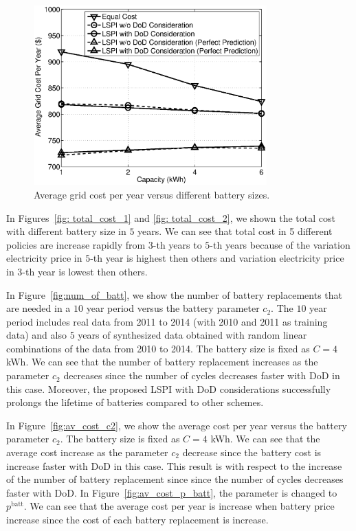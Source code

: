 \begin{figure}[H]
  \centering
  \includegraphics[width = 0.8\textwidth]{fig/av_cost_grid.eps}
  \caption{Average grid cost per year versus different battery sizes.}
  \label{fig: av_cost_grid}
\end{figure}

In Figures~\ref{fig: total_cost_1} and \ref{fig: total_cost_2}, we shown the total cost with different battery size in $5$ years. We can see that total cost in 5 different policies are increase rapidly from $3$-th years to $5$-th years because of the variation electricity price in $5$-th year is highest then others and variation electricity price in $3$-th year is lowest then others.

In Figure~\ref{fig:num_of_batt}, we show the number of battery replacements that are needed in a $10$ year period versus the battery parameter $c_2$. The $10$ year period includes real data from 2011 to 2014 (with 2010 and 2011 as training data) and also $5$ years of synthesized data obtained with random linear combinations of the data from 2010 to 2014. The battery size is fixed as $C=4$ kWh. We can see that the number of battery replacement increases as the parameter $c_2$ decreases since the number of cycles decreases faster with DoD in this case. Moreover, the proposed LSPI with DoD considerations successfully prolongs the lifetime of batteries compared to other schemes.

In Figure~\ref{fig:av_cost_c2}, we show the average cost per year versus the battery parameter $c_2$. The battery size is fixed as $C=4$ kWh. We can see that the average cost increase as the parameter $c_2$ decrease since the battery cost is increase faster with DoD in this case. This result is with respect to the increase of the number of battery replacement since since the number of cycles decreases faster with DoD. In Figure~\ref{fig:av_cost_p_batt}, the parameter is changed to $p^\text{batt}$. We can see that the average cost per year is increase when battery price increase since the cost of each battery replacement is increase.

